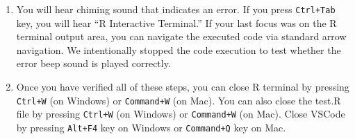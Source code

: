 \documentclass[
  letterpaper,
  DIV=11,
  numbers=noendperiod]{scrartcl}
\begin{document}
\begin{enumerate}
\def\labelenumi{\arabic{enumi}.}
\setcounter{enumi}{9}
\item
  You will hear chiming sound that indicates an error. If you press
  \texttt{Ctrl+Tab} key, you will hear ``R Interactive Terminal.'' If
  your last focus was on the R terminal output area, you can navigate
  the executed code via standard arrow navigation. We intentionally
  stopped the code execution to test whether the error beep sound is
  played correctly.
\item
  Once you have verified all of these steps, you can close R terminal by
  pressing \texttt{Ctrl+W} (on Windows) or \texttt{Command+W} (on Mac).
  You can also close the test.R file by pressing \texttt{Ctrl+W} (on
  Windows) or \texttt{Command+W} (on Mac). Close VSCode by pressing
  \texttt{Alt+F4} key on Windows or \texttt{Command+Q} key on Mac.
\end{enumerate}
\end{document}
